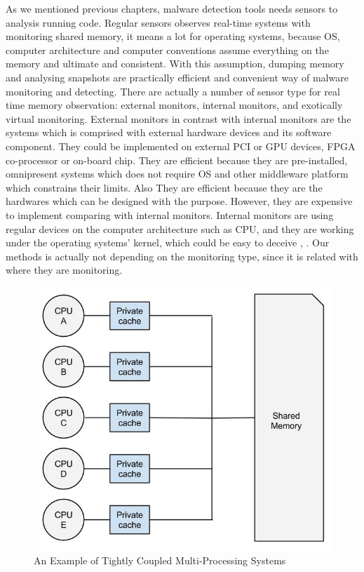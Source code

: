 As we mentioned previous chapters, malware detection tools needs sensors to analysis running code. Regular sensors observes real-time systems with monitoring shared memory, it means a lot for operating systems, because OS, computer architecture and computer conventions assume everything on the memory and ultimate and consistent. With this assumption, dumping memory and analysing snapshots are practically efficient and convenient way of malware monitoring and detecting. There are actually a number of sensor type for real time memory observation: external monitors, internal monitors, and exotically virtual monitoring. External monitors in contrast with internal monitors are the systems which is comprised with external hardware devices and its software component. They could be implemented on external PCI or GPU devices, FPGA co-processor or on-board chip\cite{Christos2013}. They are efficient because they are pre-installed, omnipresent systems which does not require OS and other middleware platform which constrains their limits. Also They are efficient because they are the hardwares which can be designed with the purpose. However, they are expensive to implement comparing with internal monitors. Internal monitors are using regular devices on the computer architecture such as CPU, and they are working under the operating systems' kernel, which could be easy to deceive \cite{Adnan2011}, \cite{rutkowska2006rootkits}. Our methods is actually not depending on the monitoring type, since it is related with where they are monitoring.
    \begin{figure}[h!]
        \centering
        \includegraphics[width=1\textwidth]{img/Tightly Coupled Multi-Processing Systems.jpg}
        \caption{An Example of Tightly Coupled Multi-Processing Systems}
        \label{fig:tightlycoupled}
    \end{figure}

